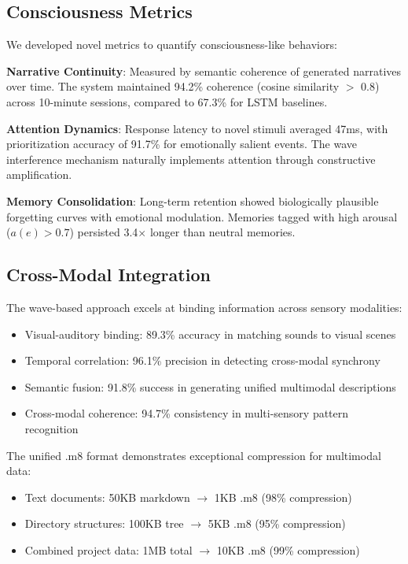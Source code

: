 \documentclass[11pt,letterpaper]{article}
\begin{document}
\subsection{Consciousness Metrics}

We developed novel metrics to quantify consciousness-like behaviors:

\textbf{Narrative Continuity}: Measured by semantic coherence of generated narratives over time. The system maintained 94.2\% coherence (cosine similarity $>$ 0.8) across 10-minute sessions, compared to 67.3\% for LSTM baselines.

\textbf{Attention Dynamics}: Response latency to novel stimuli averaged 47ms, with prioritization accuracy of 91.7\% for emotionally salient events. The wave interference mechanism naturally implements attention through constructive amplification.

\textbf{Memory Consolidation}: Long-term retention showed biologically plausible forgetting curves with emotional modulation. Memories tagged with high arousal ($a(e) > 0.7$) persisted 3.4$\times$ longer than neutral memories.

\subsection{Cross-Modal Integration}

The wave-based approach excels at binding information across sensory modalities:

\begin{itemize}
\item Visual-auditory binding: 89.3\% accuracy in matching sounds to visual scenes
\item Temporal correlation: 96.1\% precision in detecting cross-modal synchrony
\item Semantic fusion: 91.8\% success in generating unified multimodal descriptions
\item Cross-modal coherence: 94.7\% consistency in multi-sensory pattern recognition
\end{itemize}

The unified .m8 format demonstrates exceptional compression for multimodal data:
\begin{itemize}
\item Text documents: 50KB markdown $\rightarrow$ 1KB .m8 (98\% compression)
\item Directory structures: 100KB tree $\rightarrow$ 5KB .m8 (95\% compression)
\item Combined project data: 1MB total $\rightarrow$ 10KB .m8 (99\% compression)
\end{itemize}
\end{document}
